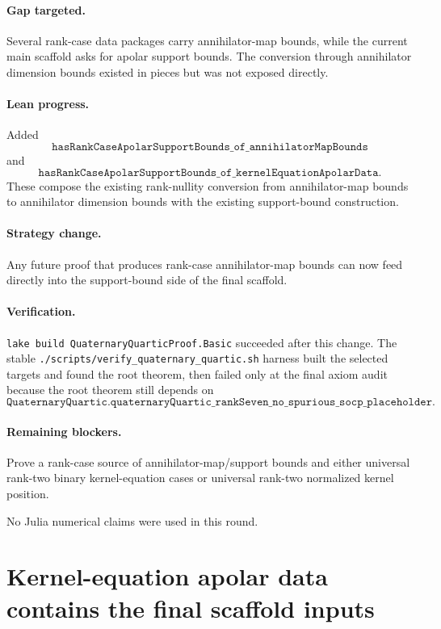 \documentclass[11pt]{article}
\begin{document}
\paragraph{Gap targeted.}
Several rank-case data packages carry annihilator-map bounds, while the current
main scaffold asks for apolar support bounds.  The conversion through
annihilator dimension bounds existed in pieces but was not exposed directly.

\paragraph{Lean progress.}
Added
\[
\texttt{hasRankCaseApolarSupportBounds\_of\_annihilatorMapBounds}
\]
and
\[
\texttt{hasRankCaseApolarSupportBounds\_of\_kernelEquationApolarData}.
\]
These compose the existing rank-nullity conversion from annihilator-map bounds
to annihilator dimension bounds with the existing support-bound construction.

\paragraph{Strategy change.}
Any future proof that produces rank-case annihilator-map bounds can now feed
directly into the support-bound side of the final scaffold.

\paragraph{Verification.}
\texttt{lake build QuaternaryQuarticProof.Basic} succeeded after this change.
The stable \texttt{./scripts/verify\_quaternary\_quartic.sh} harness built the
selected targets and found the root theorem, then failed only at the final axiom
audit because the root theorem still depends on
\[
\texttt{QuaternaryQuartic.quaternaryQuartic\_rankSeven\_no\_spurious\_socp\_placeholder}.
\]

\paragraph{Remaining blockers.}
Prove a rank-case source of annihilator-map/support bounds and either universal
rank-two binary kernel-equation cases or universal rank-two normalized kernel
position.

No Julia numerical claims were used in this round.

\section*{Kernel-equation apolar data contains the final scaffold inputs}
\end{document}
